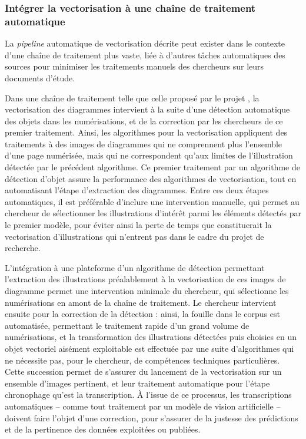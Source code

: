 	\subsubsection{Intégrer la vectorisation à une chaîne de traitement automatique}
	La \textit{pipeline} automatique de vectorisation décrite peut exister dans le contexte d'une chaîne de traitement plus vaste, liée à d'autres tâches automatiques des sources pour minimiser les traitements manuels des chercheurs sur leurs documents d'étude. 
	
	Dans une chaîne de traitement telle que celle proposé par le projet \eida, la vectorisation des diagrammes intervient à la suite d'une détection automatique des objets dans les numérisations, et de la correction par les chercheurs de ce premier traitement. Ainsi, les algorithmes pour la vectorisation appliquent des traitements à des images de diagrammes qui ne comprennent plus l'ensemble d'une page numérisée, mais qui ne correspondent qu'aux limites de l'illustration détectée par le précédent algorithme. Ce premier traitement par un algorithme de détection d'objet assure la performance des algorithmes de vectorisation, tout en automatisant l'étape d'extraction des diagrammes. Entre ces deux étapes automatiques, il est préférable d'inclure une intervention manuelle, qui permet au chercheur de sélectionner les illustrations d'intérêt parmi les éléments détectés par le premier modèle, pour éviter ainsi la perte de temps que constituerait la vectorisation d'illustrations qui n'entrent pas dans le cadre du projet de recherche. 
	
	L'intégration à une plateforme d'un algorithme de détection permettant l'extraction des illustrations préalablement à la vectorisation de ces images de diagramme permet une intervention minimale du chercheur, qui sélectionne les numérisations en amont de la chaîne de traitement. Le chercheur intervient ensuite pour la correction de la détection : ainsi, la fouille dans le corpus est automatisée, permettant le traitement rapide d'un grand volume de numérisations, et la transformation des illustrations détectées puis choisies en un objet vectoriel aisément exploitable est effectuée par une suite d'algorithmes qui ne nécessite pas, pour le chercheur, de compétences techniques particulières. Cette succession permet de s'assurer du lancement de la vectorisation sur un ensemble d'images pertinent, et leur traitement automatique pour l'étape chronophage qu'est la transcription. À l'issue de ce processus, les transcriptions automatiques -- comme tout traitement par un modèle de vision artificielle -- doivent faire l'objet d'une correction, pour s'assurer de la justesse des prédictions et de la pertinence des données exploitées ou publiées.

